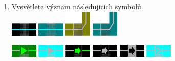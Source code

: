 \documentclass[12pt,a4paper]{article}
\begin{document}
\begin{enumerate}[leftmargin=*]
\item Vysvětlete význam následujících symbolů. \\
\includegraphics[width=0.1\textwidth]{symboly/kol5.png}
\includegraphics[width=0.1\textwidth]{symboly/kol7.png}
\includegraphics[width=0.1\textwidth]{symboly/kol20.png}
\includegraphics[width=0.1\textwidth]{symboly/kol21.png}

\includegraphics[width=0.1\textwidth]{symboly/hlnav9.png}
\includegraphics[width=0.1\textwidth]{symboly/hlnav15.png}
\includegraphics[width=0.1\textwidth]{symboly/hlnav17.png}
\includegraphics[width=0.1\textwidth]{symboly/hlnav18.png}
\includegraphics[width=0.1\textwidth]{symboly/hlnav19.png}
\includegraphics[width=0.1\textwidth]{symboly/senav14.png}


\end{enumerate}
\end{document}
